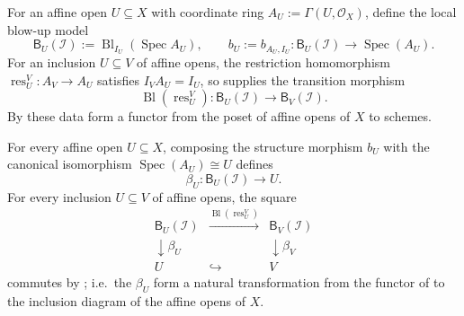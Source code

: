 \begin{definition}
  \label{def:nagata-global-blowup-local-model}
  \leanok

  For an affine open $U\subseteq X$ with coordinate ring
  $A_U:=\Gamma(U,\mathcal O_X)$, define the local blow-up model
  \[
    \mathsf B_U(\mathcal I):=\operatorname{Bl}_{I_U}(\operatorname{Spec}A_U),
    \qquad
    b_U:=b_{A_U,I_U}\colon\mathsf B_U(\mathcal I)\longrightarrow
      \operatorname{Spec}(A_U).
  \]
  For an inclusion $U\subseteq V$ of affine opens, the restriction
  homomorphism
  $\operatorname{res}^V_U\colon A_V\to A_U$ satisfies
  $I_V A_U=I_U$, so 
  supplies the transition morphism
  \[
    \operatorname{Bl}(\operatorname{res}^V_U)\colon
      \mathsf B_U(\mathcal I)\longrightarrow\mathsf B_V(\mathcal I).
  \]
  By  these data form a
  functor from the poset of affine opens of $X$ to schemes.
\end{definition}

\begin{definition}
  \label{def:nagata-global-blowup-overlap-basic-map}
  \leanok

  For every affine open $U\subseteq X$, composing the structure morphism
  $b_U$ with the canonical isomorphism
  $\operatorname{Spec}(A_U)\cong U$ defines
  \[
    \beta_U\colon\mathsf B_U(\mathcal I)\longrightarrow U.
  \]
  For every inclusion $U\subseteq V$ of affine opens, the square
  \[
    \begin{array}{ccc}
      \mathsf B_U(\mathcal I)
        &\xrightarrow{\operatorname{Bl}(\operatorname{res}^V_U)}
        &\mathsf B_V(\mathcal I)\\
      \downarrow\beta_U& &\downarrow\beta_V\\
      U&\hookrightarrow&V
    \end{array}
  \]
  commutes by ; i.e.\ the
  $\beta_U$ form a natural transformation from the functor of
   to the inclusion diagram of
  the affine opens of $X$.
\end{definition}


